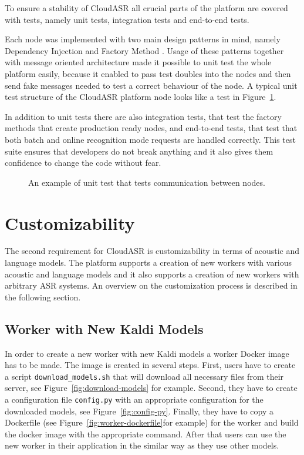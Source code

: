 To ensure a stability of CloudASR all crucial parts of the platform are covered with tests,
  namely unit tests, integration tests and end-to-end tests.

Each node was implemented with two main design patterns in mind, namely Dependency Injection \cite{fowler2004inversion} and Factory Method \cite{gamma1993design}.
Usage of these patterns together with message oriented architecture made it possible to unit test the whole platform easily,
  because it enabled to pass test doubles into the nodes
  and then send fake messages needed to test a correct behaviour of the node.
A typical unit test structure of the CloudASR platform node looks like a test in Figure~\ref{fig:unit-test}.

In addition to unit tests there are also integration tests,
  that test the factory methods that create production ready nodes,
  and end-to-end tests,
  that test that both batch and online recognition mode requests are handled correctly.
This test suite ensures that developers do not break anything
  and it also gives them confidence to change the code without fear.

\begin{figure}[h]
  

  \caption{An example of unit test that tests communication between nodes.}
  \label{fig:unit-test}
\end{figure}


\section{Customizability}
The second requirement for CloudASR is customizability in terms of acoustic and language models.
The platform supports a creation of new workers with various acoustic and language models and
  it also supports a creation of new workers with arbitrary ASR systems.
An overview on the customization process is described in the following section.


\subsection{Worker with New Kaldi Models}
In order to create a new worker with new Kaldi models a worker Docker image has to be made.
The image is created in several steps.
First, users have to create a script \texttt{download\_models.sh}
  that will download all necessary files from their server,
  see Figure~\ref{fig:download-models} for example.
Second, they have to create a configuration file \texttt{config.py} with an appropriate configuration for the downloaded models,
  see Figure~\ref{fig:config-py}.
Finally, they have to copy a Dockerfile (see Figure~\ref{fig:worker-dockerfile}for example) for the worker
  and build the docker image with the appropriate command.
After that users can use the new worker in their application in the similar way as they use other models.

